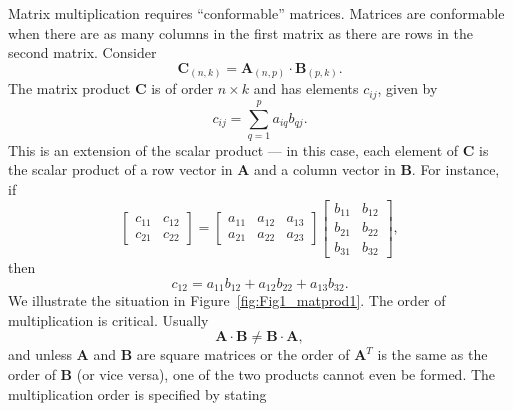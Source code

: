 Matrix multiplication requires ``conformable'' matrices. Matrices are conformable when 
there are as many columns in the first matrix as there are rows in the second matrix.  Consider
\begin{equation}
\mathbf{C}_{(n,k)} = \mathbf{A}_{(n,p)} \cdot \mathbf{B}_{(p,k)}.
\end{equation}	 
The matrix product $\mathbf{C}$ is of order $n \times k$ and has elements $c_{ij}$, given by
\begin{equation}
c_{ij} = \sum^p _{q=1} a_{iq}b_{qj}.
\end{equation}	 
This is an extension of the scalar product --- in this case, each element of $\mathbf{C}$ is the scalar product of a row 
vector in $\mathbf{A}$ and a column vector in $\mathbf{B}$.  For instance, if
\begin{equation}
\left[
\begin{array}{cc}
c_{11} & c_{12} \\
c_{21} & c_{22} 
\end{array}
\right ]
=
\left[
\begin{array}{ccc}
a_{11}&  a_{12} &  a_{13}\\
a_{21}&  a_{22} &  a_{23}
\end{array}
\right ]
\left [
\begin{array}{cc}
b_{11} & b_{12}\\
b_{21} & b_{22}\\
b_{31} & b_{32}
\end{array}
\right],
\end{equation}
then
\begin{equation}
c_{12} = a_{11}b_{12} + a_{12}b_{22} + a_{13}b_{32}.
\end{equation}
We illustrate the situation in Figure~\ref{fig:Fig1_matprod1}.
The order of multiplication is critical. Usually
\begin{equation}
\mathbf{A \cdot B \neq B \cdot A},
\end{equation}	 
and unless $\mathbf{A}$ and $\mathbf{B}$ are square matrices or the order of $\mathbf{A}^T$ is the same as the order of $\mathbf{B}$ (or vice 
versa), one of the two products cannot even be formed. The multiplication order is specified by stating

